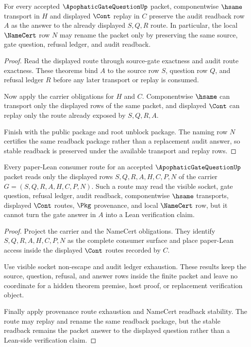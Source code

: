 \begin{theorem}
\label{thm:apophatic-gate-question-namecert-readback-stability}
For every accepted $\ApophaticGateQuestionUp$ packet, componentwise $\hsame$ transport in $H$ and displayed $\Cont$ replay in $C$ preserve the audit readback row $A$ as the answer to the already displayed $S,Q,R$ route. In particular, the local $\NameCert$ row $N$ may rename the packet only by preserving the same source, gate question, refusal ledger, and audit readback.
\end{theorem}
\begin{proof}
Read the displayed route through source-gate exactness and audit route exactness. These theorems bind $A$ to the source row $S$, question row $Q$, and refusal ledger $R$ before any later transport or replay is consumed.

Now apply the carrier obligations for $H$ and $C$. Componentwise $\hsame$ can transport only the displayed rows of the same packet, and displayed $\Cont$ can replay only the route already exposed by $S,Q,R,A$.

Finish with the public \NameCert{} package and root unblock package. The naming row $N$ certifies the same readback package rather than a replacement audit answer, so stable readback is preserved under the available transport and replay rows.
\end{proof}

\begin{theorem}
\label{thm:apophatic-gate-question-paper-lean-route-separation}
Every paper-Lean consumer route for an accepted $\ApophaticGateQuestionUp$ packet reads only the displayed rows $S,Q,R,A,H,C,P,N$ of the carrier $G=(S,Q,R,A,H,C,P,N)$. Such a route may read the visible socket, gate question, refusal ledger, audit readback, componentwise $\hsame$ transports, displayed $\Cont$ routes, $\Pkg$ provenance, and local $\NameCert$ row, but it cannot turn the gate answer in $A$ into a Lean verification claim.
\end{theorem}
\begin{proof}
Project the carrier and the NameCert obligations. They identify $S,Q,R,A,H,C,P,N$ as the complete consumer surface and place paper-Lean access inside the displayed $\Cont$ routes recorded by $C$.

Use visible socket non-escape and audit ledger exhaustion. These results keep the source, question, refusal, and answer rows inside the finite packet and leave no coordinate for a hidden theorem premise, host proof, or replacement verification object.

Finally apply provenance route exhaustion and NameCert readback stability. The route may replay and rename the same readback package, but the stable readback remains the packet answer to the displayed question rather than a Lean-side verification claim.
\end{proof}


